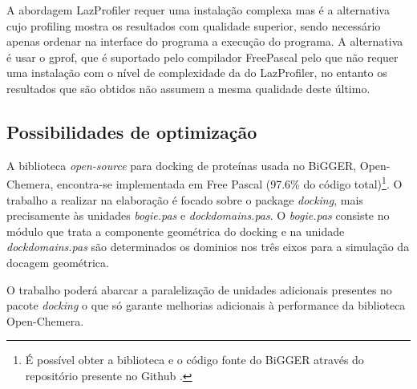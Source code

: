  A abordagem LazProfiler requer uma instalação complexa mas é a alternativa cujo profiling mostra os resultados com qualidade superior, sendo necessário apenas ordenar na interface do programa a execução do programa. A alternativa é usar o gprof, que é suportado pelo compilador FreePascal pelo que não requer uma instalação com o nível de complexidade da do LazProfiler, no entanto os resultados que são obtidos não assumem a mesma qualidade deste último.
 
 
\subsection{Possibilidades de optimização} %
\label{abordagem}
A biblioteca \textit{open-source} para docking de proteínas usada no BiGGER, Open-Chemera, encontra-se implementada em Free Pascal (97.6\% do código total)\footnote[11]{É possível obter a biblioteca e o código fonte do BiGGER através do repositório presente no Github \cite{openChemera}. }. O trabalho a realizar na elaboração é focado sobre o package \textit{docking}, mais precisamente às unidades \textit{bogie.pas} e \textit{dockdomains.pas}. O \textit{bogie.pas} consiste no módulo que trata a componente geométrica do docking e na unidade \textit{dockdomains.pas} são determinados os dominios nos três eixos para a simulação da docagem geométrica.

 O trabalho poderá abarcar a paralelização de unidades adicionais presentes no pacote \textit{docking} o que só garante melhorias adicionais à performance da biblioteca Open-Chemera. 
 
